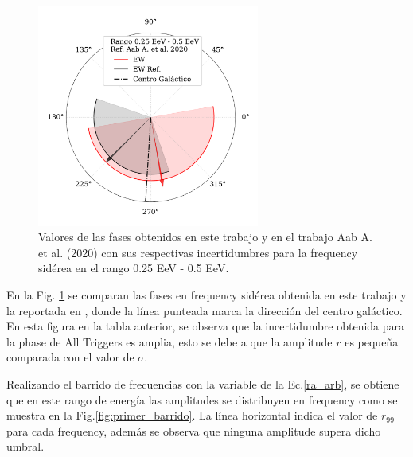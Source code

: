 \documentclass[12pt, doublespace, oneside]{article}
\begin{document}
\begin{figure}[H]
    \begin{small}
        \begin{center}
            \vspace*{-1. cm}
            \includegraphics[width=0.65\textwidth]{Figs/phase_primer_bin_v3.pdf}
            \vspace*{-1 cm}
        \end{center}
        \caption{Valores de las fases obtenidos en este trabajo y en el trabajo Aab A. et al. (2020) \cite{Aab_2020} con sus respectivas incertidumbres para la frequency sidérea en el  rango 0.25 EeV - 0.5 EeV.}
        \label{fig:primer}
    \end{small}
\end{figure}

En la Fig. \ref{fig:primer} se comparan las  fases en frequency sidérea obtenida en este trabajo y la reportada en \cite{Aab_2020}, donde la línea punteada marca la dirección del centro galáctico.  En esta figura en la tabla anterior, se observa que la incertidumbre obtenida para la phase de All Triggers es amplia, esto se debe a que la amplitude $r$ es pequeña comparada con el valor de $\sigma$. 


Realizando el barrido de frecuencias con la variable de la Ec.\ref{ra_arb}, se obtiene que en este rango de energía las amplitudes se  distribuyen en frequency como se muestra en la Fig.\ref{fig:primer_barrido}. La línea horizontal indica el valor de $r_{99}$ para cada frequency, además se observa que ninguna amplitude supera dicho umbral.
\end{document}
